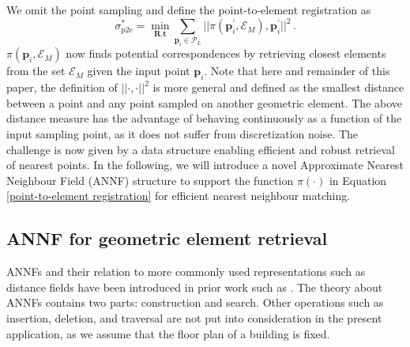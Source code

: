 \documentclass[letterpaper, 10 pt, conference]{ieeeconf}  %
\begin{document}
We omit the point sampling and define the point-to-element registration as
%
\begin{equation}
    \label{point-to-element registration}
    \sigma^*_{\text{p2e}} = \min_{\textbf{R}, \textbf{t}} \sum_{\mathbf{p}_i \in \mathcal{P}_L}
                            || \pi(\mathbf{p}_i^{\prime}, \mathcal{E}_M), \mathbf{p}_i^{\prime} ||^2 \,.
\end{equation}
%
$\pi(\mathbf{p}_i, \mathcal{E}_M)$ now finds potential correspondences by retrieving closest elements from the set $\mathcal{E}_M$ given the input point $\mathbf{p}_i$. Note that here and remainder of this paper, the definition of $||\cdot,\cdot||^2$ is more general and defined as the smallest distance between a point and any point sampled on another geometric element. The above distance measure has the advantage of behaving continuously as a function of the input sampling point, as it does not suffer from discretization noise. The challenge is now given by a data structure enabling efficient and robust retrieval of nearest points. In the following, we will introduce a novel Approximate Nearest Neighbour Field (ANNF) structure to support the function $\pi(\cdot)$ in Equation \ref{point-to-element registration} for efficient nearest neighbour matching.

\subsection{ANNF for geometric element retrieval}

ANNFs and their relation to more commonly used representations such as distance fields have been introduced in prior work such as \cite{zhou2018canny}. The theory about ANNFs contains two parts: construction and search. Other operations such as insertion, deletion, and traversal are not put into consideration in the present application, as we assume that the floor plan of a building is fixed.
\end{document}

